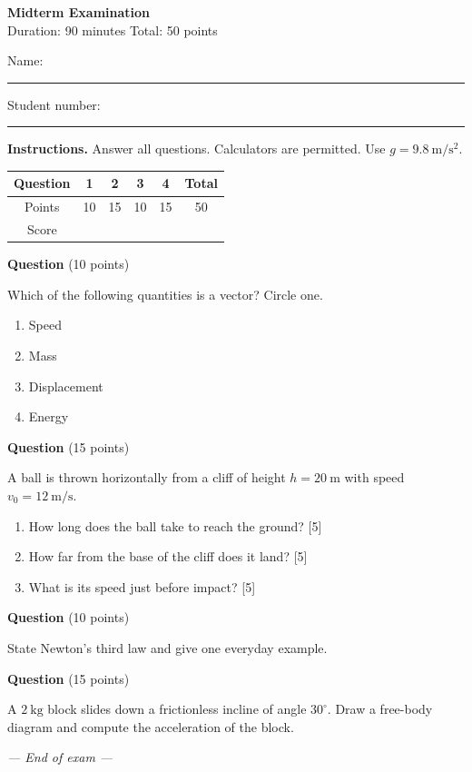 \documentclass[11pt]{article}
\newcounter{qnum}
\newcommand{\question}[1]{\stepcounter{qnum}\par\medskip\noindent\textbf{Question \theqnum}\hfill(#1 points)\par}
\newcommand{\answerlines}[1]{\par\vspace{#1}}
\begin{document}
\begin{center}
{\Large\bfseries Midterm Examination}\\[2pt]
Duration: 90 minutes \quad Total: 50 points
\end{center}

\noindent Name: \rule{7cm}{0.4pt} \hfill Student number: \rule{4cm}{0.4pt}

\medskip
\noindent\textbf{Instructions.} Answer all questions. Calculators are permitted. Use
$g = 9.8~\mathrm{m/s^2}$.

\begin{center}
\begin{tabular}{|c|c|c|c|c|c|}
\hline
Question & 1 & 2 & 3 & 4 & Total \\ \hline
Points   & 10 & 15 & 10 & 15 & 50 \\ \hline
Score    &    &    &    &    &    \\ \hline
\end{tabular}
\end{center}

\question{10}
Which of the following quantities is a vector? Circle one.
\begin{enumerate}[label=(\Alph*), itemsep=0pt]
  \item Speed
  \item Mass
  \item Displacement
  \item Energy
\end{enumerate}

\question{15}
A ball is thrown horizontally from a cliff of height $h = 20~\mathrm{m}$ with speed
$v_0 = 12~\mathrm{m/s}$.
\begin{enumerate}[label=(\alph*)]
  \item How long does the ball take to reach the ground? \hfill [5]
  \item How far from the base of the cliff does it land? \hfill [5]
  \item What is its speed just before impact? \hfill [5]
\end{enumerate}
\answerlines{4cm}

\question{10}
State Newton's third law and give one everyday example.
\answerlines{3cm}

\question{15}
A $2~\mathrm{kg}$ block slides down a frictionless incline of angle $30^\circ$.
Draw a free-body diagram and compute the acceleration of the block.
\answerlines{5cm}

\begin{center}
\textit{--- End of exam ---}
\end{center}
\end{document}
